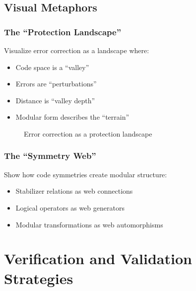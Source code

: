 \documentclass[11pt,a4paper]{article}
\begin{document}
\subsection{Visual Metaphors}

\subsubsection{The ``Protection Landscape''}
Visualize error correction as a landscape where:
\begin{itemize}
\item Code space is a ``valley''
\item Errors are ``perturbations''
\item Distance is ``valley depth''
\item Modular form describes the ``terrain''
\end{itemize}

\begin{figure}[h]
\centering
{}
\caption{Error correction as a protection landscape}
\end{figure}

\subsubsection{The ``Symmetry Web''}
Show how code symmetries create modular structure:
\begin{itemize}
\item Stabilizer relations as web connections
\item Logical operators as web generators
\item Modular transformations as web automorphisms
\end{itemize}

\section{Verification and Validation Strategies}
\end{document}
